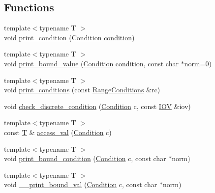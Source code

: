 \subsection*{Functions}
\begin{DoxyCompactItemize}
\item 
{\footnotesize template$<$typename T $>$ }\\void \hyperlink{namespace_d_d4hep_1_1_conditions_1_1_test_a366e32be71ba92be577b9a2b6b7a9807}{print\_\-condition} (\hyperlink{class_d_d4hep_1_1_conditions_1_1_condition}{Condition} condition)
\item 
{\footnotesize template$<$typename T $>$ }\\void \hyperlink{namespace_d_d4hep_1_1_conditions_1_1_test_a340ecdd15aa8418ed34b456de54cdcdf}{print\_\-bound\_\-value} (\hyperlink{class_d_d4hep_1_1_conditions_1_1_condition}{Condition} condition, const char $\ast$norm=0)
\item 
{\footnotesize template$<$typename T $>$ }\\void \hyperlink{namespace_d_d4hep_1_1_conditions_1_1_test_a09370dcb1c48fdeb75b180903e0af2d0}{print\_\-conditions} (const \hyperlink{namespace_d_d4hep_1_1_conditions_ae765f0140a33973a430280f02b6062f4}{RangeConditions} \&rc)
\item 
void \hyperlink{namespace_d_d4hep_1_1_conditions_1_1_test_a49378cef6a8e31974f1f44b1eaf39b3a}{check\_\-discrete\_\-condition} (\hyperlink{class_d_d4hep_1_1_conditions_1_1_condition}{Condition} c, const \hyperlink{class_d_d4hep_1_1_i_o_v}{IOV} \&iov)
\item 
{\footnotesize template$<$typename T $>$ }\\const \hyperlink{class_t}{T} \& \hyperlink{namespace_d_d4hep_1_1_conditions_1_1_test_a4ad4f8e918d11c5287e5703c68bde9db}{access\_\-val} (\hyperlink{class_d_d4hep_1_1_conditions_1_1_condition}{Condition} c)
\item 
{\footnotesize template$<$typename T $>$ }\\void \hyperlink{namespace_d_d4hep_1_1_conditions_1_1_test_ae50648dc20623f019e5b52d502c99216}{print\_\-bound\_\-condition} (\hyperlink{class_d_d4hep_1_1_conditions_1_1_condition}{Condition} c, const char $\ast$norm)
\item 
{\footnotesize template$<$typename T $>$ }\\void \hyperlink{namespace_d_d4hep_1_1_conditions_1_1_test_a2a07c4c54934f051caed3cf6d88e5074}{\_\-\_\-print\_\-bound\_\-val} (\hyperlink{class_d_d4hep_1_1_conditions_1_1_condition}{Condition} c, const char $\ast$norm)

\end{DoxyCompactItemize}

